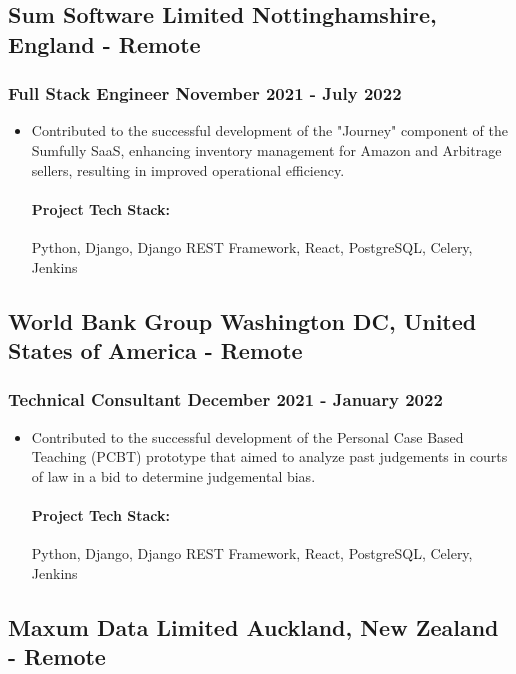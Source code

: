 \documentclass[11pt]{article} %
\begin{document}
\subsection{Sum Software Limited \hfill Nottinghamshire, England - Remote}
\subsubsection{Full Stack Engineer \hfill  November 2021 - July 2022}
\begin{itemize}
    \item Contributed to the successful development of the "Journey" component of the Sumfully SaaS, enhancing inventory management for Amazon and Arbitrage sellers, resulting in improved operational efficiency.

    \paragraph{Project Tech Stack:} Python, Django, Django REST Framework, React, PostgreSQL, Celery, Jenkins
\end{itemize}


\subsection{World Bank Group \hfill Washington DC, United States of America - Remote}
\subsubsection{Technical Consultant \hfill  December 2021 - January 2022}
\begin{itemize}
    \item Contributed to the successful development of the Personal Case Based Teaching (PCBT) prototype that aimed to analyze past judgements in courts of law in a bid to determine judgemental bias.

    \paragraph{Project Tech Stack:} Python, Django, Django REST Framework, React, PostgreSQL, Celery, Jenkins
\end{itemize}


\subsection{Maxum Data Limited \hfill Auckland, New Zealand - Remote}
\end{document}
